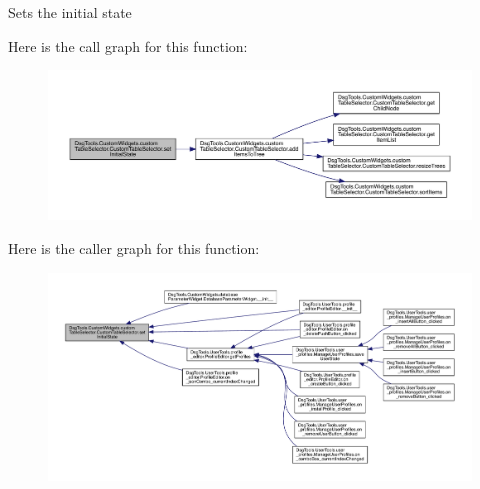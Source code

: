 \begin{DoxyVerb}Sets the initial state
\end{DoxyVerb}
 Here is the call graph for this function\+:
\nopagebreak
\begin{figure}[H]
\begin{center}
\leavevmode
\includegraphics[width=350pt]{class_dsg_tools_1_1_custom_widgets_1_1custom_table_selector_1_1_custom_table_selector_a652d2b7bc88ffaa2fa68245381aa21df_cgraph}
\end{center}
\end{figure}
Here is the caller graph for this function\+:
\nopagebreak
\begin{figure}[H]
\begin{center}
\leavevmode
\includegraphics[width=350pt]{class_dsg_tools_1_1_custom_widgets_1_1custom_table_selector_1_1_custom_table_selector_a652d2b7bc88ffaa2fa68245381aa21df_icgraph}
\end{center}
\end{figure}
\mbox{\label{class_dsg_tools_1_1_custom_widgets_1_1custom_table_selector_1_1_custom_table_selector_af12550c906f5410bb04613baa46b880a}} 
